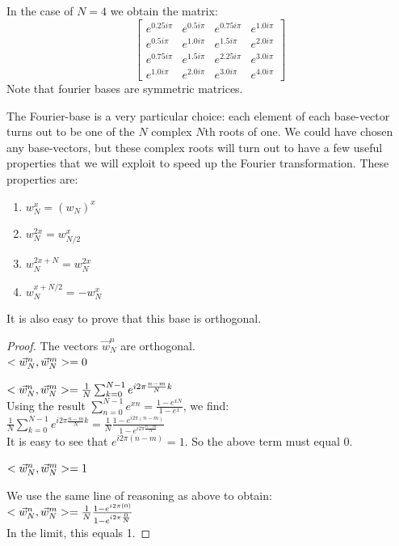 In the case of $N = 4$ we obtain the matrix:
$$ \left[\begin{matrix}e^{0.25 i \pi} & e^{0.5 i \pi} & e^{0.75 i \pi} & e^{1.0 i \pi}\\e^{0.5 i \pi} & e^{1.0 i \pi} & e^{1.5 i \pi} & e^{2.0 i \pi}\\e^{0.75 i \pi} & e^{1.5 i \pi} & e^{2.25 i \pi} & e^{3.0 i \pi}\\e^{1.0 i \pi} & e^{2.0 i \pi} & e^{3.0 i \pi} & e^{4.0 i \pi}\end{matrix}\right] $$
Note that fourier bases are symmetric matrices. 

The Fourier-base is a very particular choice: each element of each base-vector turns out to be one of the $N$ complex $N$th roots of one. We could have chosen any base-vectors, but these complex roots will turn out to have a few useful properties that we will exploit to speed up the Fourier transformation. These properties are:

\begin{enumerate}
    \item $w_N^x = (w_N)^x$
    \item $w_N^{2x} = w_{N/2}^x$
    \item $w_N^{2x+N} = w_N^{2x}$
    \item $w_N^{x+N/2} = - w_N^x$
\end{enumerate}

It is also easy to prove that this base is orthogonal.
\begin{proof} The vectors $\vec{w}_N^n$ are orthogonal. \\
    {$< \vec{w}_N^n , \vec{w}_N^m > = 0$ }{
    
    $< \vec{w}_N^n , \vec{w}_N^m > = \frac{1}{N} \sum_{k=0}^{N-1} e^{i 2\pi \frac{n-m}{N} k} $ \\
    
    Using the result $\sum_{n=0}^{N-1} e^{xn} = \frac{1-e^{xN}}{1-e^{x}}$, we find: \\
    
    $\frac{1}{N} \sum_{k=0}^{N-1} e^{i 2\pi \frac{n-m}{N} k} = \frac{1}{N} \frac{1-e^{i 2\pi (n-m)}}{1-e^{i 2\pi \frac{n-m}{N}}}$ \\
    
    It is easy to see that $e^{i 2\pi (n-m)} = 1$. So the above term must equal 0.
    
    
}
    {$< \vec{w}_N^n , \vec{w}_N^m > = 1$ }{

    We use the same line of reasoning as above to obtain: \\
    
    $ < \vec{w}_N^n , \vec{w}_N^m > = \frac{1}{N} \frac{1-e^{i 2\pi (0)}}{1-e^{i 2\pi \frac{0}{N}}}$ \\
    
    In the limit, this equals 1.
}
\end{proof}


